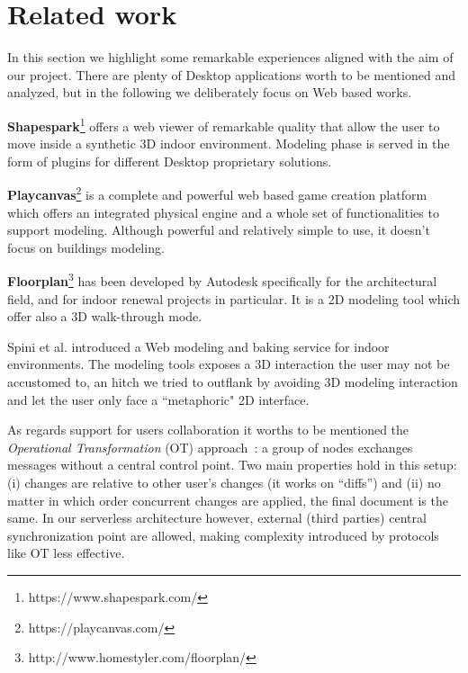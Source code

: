 \section{Related work}\label{sec:related_work}

In this section we highlight some remarkable experiences aligned with the aim of our project. There are plenty of Desktop applications worth to be mentioned and analyzed, but in the following we deliberately focus on Web based works. 

\textbf{Shapespark}\footnote{https://www.shapespark.com/} offers a web viewer of remarkable quality that allow the user to move inside a synthetic 3D indoor environment. Modeling phase is served in the form of plugins for different Desktop proprietary solutions.

\textbf{Playcanvas}\footnote{https://playcanvas.com/} is a complete and powerful web based game creation platform which offers an integrated physical engine and a whole set of functionalities to support modeling. Although powerful and relatively simple to use, it doesn't focus on buildings modeling.

\textbf{Floorplan}\footnote{http://www.homestyler.com/floorplan/} has been developed by Autodesk specifically for the architectural field, and for indoor renewal projects in particular. It is a 2D modeling tool which offer also a 3D walk-through mode.

Spini et al. \cite{Spini:2016:WIA:2945292.2945309} introduced a Web modeling and baking service for indoor environments. The modeling tools exposes a 3D interaction the user may not be accustomed to, an hitch we tried to outflank by avoiding 3D modeling interaction and let the user only face a ``metaphoric" 2D interface.

As regards support for users collaboration it worths to be mentioned the \emph{Operational Transformation} (OT) approach~\cite{Ellis:1989:CCG:66926.66963}: a group of nodes exchanges messages without a central control point. Two main properties hold in this setup: (i) changes are relative to other user's changes (it works on ``diffs'') and (ii) no matter in which order concurrent changes are applied, the final document is the same. In our serverless architecture however, external (third parties) central synchronization point are allowed, making complexity introduced by protocols like OT less effective.